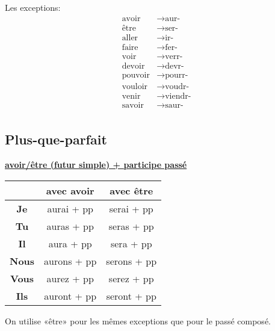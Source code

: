 \documentclass[12pt, a4paper]{article}
\begin{document}
\begin{multicols*}{3}
Les exceptions:
\begin{align*}
  \text{avoir} &\rightarrow \text{aur-}\\ 
  \text{être} &\rightarrow \text{ser-}\\ 
  \text{aller} &\rightarrow \text{ir-}\\ 
  \text{faire} &\rightarrow \text{fer-}\\ 
  \text{voir} &\rightarrow \text{verr-}\\ 
  \text{devoir} &\rightarrow \text{devr-}\\ 
  \text{pouvoir} &\rightarrow \text{pourr-}\\ 
  \text{vouloir} &\rightarrow \text{voudr-}\\ 
  \text{venir} &\rightarrow \text{viendr-}\\ 
  \text{savoir} &\rightarrow \text{saur-}\\ 
\end{align*}

\subsection{Plus-que-parfait}
\begin{center}
\underline{\textbf{avoir/être (futur simple) + participe passé}}
\begin{tabular}{|c|c|c|}
  \hline
  & \textbf{avec avoir} & \textbf{avec être}\\\hline
  \textbf{Je} & aurai + pp & serai + pp \\\hline
  \textbf{Tu} & auras + pp & seras + pp \\\hline
  \textbf{Il} & aura + pp & sera + pp \\\hline
  \textbf{Nous} & aurons + pp & serons + pp \\\hline
  \textbf{Vous} & aurez + pp & serez + pp \\\hline
  \textbf{Ils} & auront + pp & seront + pp \\\hline
\end{tabular}
\end{center}

On utilise «être» pour les mêmes exceptions que pour le passé composé.
\colbreak


\end{multicols*}
\end{document}
